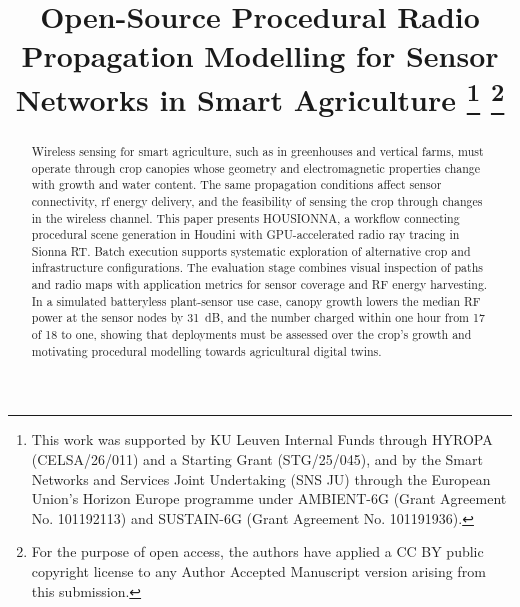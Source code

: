 \documentclass[conference]{IEEEtran}
\newcommand{\housionna}{\textsc{HOUSIONNA}\xspace}
\begin{document}
\title{Open-Source Procedural Radio Propagation Modelling for Sensor Networks in Smart Agriculture
\thanks{This work was supported by KU Leuven Internal Funds through HYROPA (CELSA/26/011) and a Starting Grant (STG/25/045), and by the Smart Networks and Services Joint Undertaking (SNS JU) through the European Union’s Horizon Europe programme under AMBIENT-6G (Grant Agreement No. 101192113) and SUSTAIN-6G (Grant Agreement No. 101191936).}%
\thanks{For the purpose of open access, the authors have applied a CC BY public copyright license to any Author Accepted Manuscript version arising from this submission.} %
}

\author{
}

\maketitle

\begin{abstract}
Wireless sensing for smart agriculture, such as in greenhouses and vertical farms, must operate through crop canopies whose geometry and electromagnetic properties change with growth and water content. The same propagation conditions affect sensor connectivity, \gls{rf} energy delivery, and the feasibility of sensing the crop through changes in the wireless channel. This paper presents \housionna{}, a workflow connecting procedural scene generation in Houdini with GPU-accelerated radio ray tracing in Sionna RT. Batch execution supports systematic exploration of alternative crop and infrastructure configurations. The evaluation stage combines visual inspection of paths and radio maps with application metrics for sensor coverage and RF energy harvesting. In a simulated batteryless plant-sensor use case, canopy growth lowers the median RF power at the sensor nodes by \SI{31}{dB}, and the number charged within one hour from 17 of 18 to one, showing that deployments must be assessed over the crop's growth and motivating procedural modelling towards agricultural digital twins.

\end{abstract}
\end{document}
